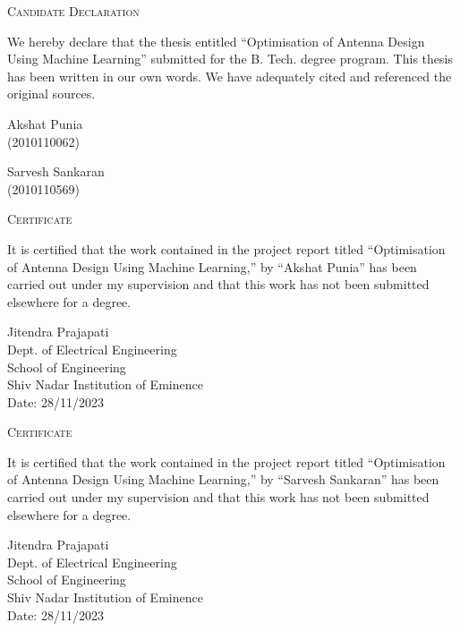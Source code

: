 \documentclass[a4paper,12pt]{report}
\begin{document}
\pagebreak
\begin{center}
\huge{\textsc{Candidate Declaration}}
\vspace{1cm}
\end{center}
We hereby declare that the thesis entitled “Optimisation of Antenna Design Using Machine Learning” submitted for the B. Tech. degree program. This thesis has been written in our own words. We have adequately cited and referenced the original sources.
\vspace{2cm}\\
\begin{minipage}{4.5cm}
Akshat Punia\\
(2010110062)
\end{minipage}
\hfill
\begin{minipage}{4.5cm}
Sarvesh Sankaran\\
(2010110569)
\end{minipage}
\pagebreak
\begin{center}
\huge{\textsc{Certificate}}
\vspace{1cm}
\end{center}
It is certified that the work contained in the project report titled “Optimisation of Antenna Design Using Machine Learning,” by “Akshat Punia” has been carried out under my supervision and that this work has not been submitted elsewhere for a degree.
\vspace{2cm}\\
\begin{minipage}{7cm}
Jitendra Prajapati\\
Dept. of Electrical Engineering\\
School of Engineering\\
Shiv Nadar Institution of Eminence\\
Date: 28/11/2023 
\end{minipage}
\pagebreak
\begin{center}
\huge{\textsc{Certificate}}
\vspace{1cm}
\end{center}
It is certified that the work contained in the project report titled “Optimisation of Antenna Design Using Machine Learning,” by “Sarvesh Sankaran” has been carried out under my supervision and that this work has not been submitted elsewhere for a degree.
\vspace{2cm}\\
\begin{minipage}{7cm}
Jitendra Prajapati\\
Dept. of Electrical Engineering\\
School of Engineering\\
Shiv Nadar Institution of Eminence\\
Date: 28/11/2023 
\end{minipage}
\end{document}
